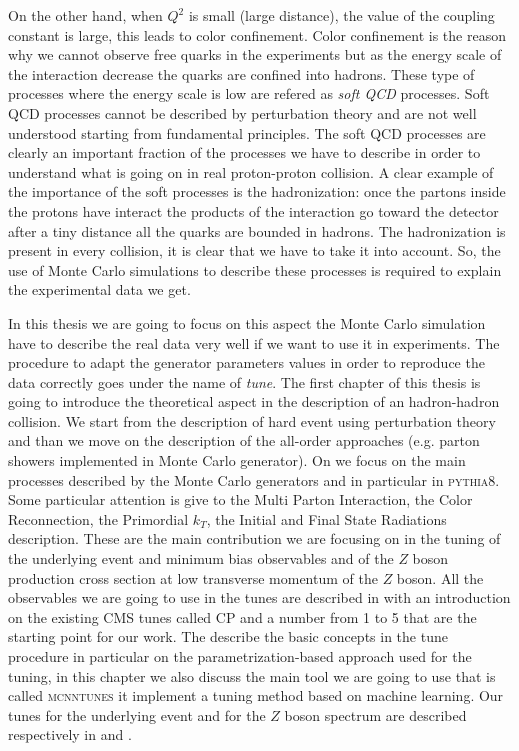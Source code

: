 \noindent On the other hand, when $Q^2$ is small (large distance), the value of the coupling constant is large, this leads to color confinement. Color confinement is the reason why we cannot observe free quarks in the experiments but as the energy scale of the interaction decrease the quarks are confined into hadrons. These type of processes where the energy scale is low are refered as \textit{soft QCD} processes. Soft QCD processes cannot be described by perturbation theory and are not well understood starting from fundamental principles. The soft QCD processes are clearly an important fraction of the processes we have to describe in order to understand what is going on in real proton-proton collision. A clear example of the importance of the soft processes is the hadronization: once the partons inside the protons have interact the products of the interaction go toward the detector after a tiny distance all the quarks are bounded in hadrons. The hadronization is present in every collision, it is clear that we have to take it into account.  
So, the use of Monte Carlo simulations to describe these processes is required to explain the experimental data we get. 


In this thesis we are going to focus on this aspect the Monte Carlo simulation have to describe the real data very well if we want to use it in experiments. The procedure to adapt the generator parameters values in order to reproduce the data correctly goes under the name of \textit{tune}. The first chapter of this thesis is going to introduce the theoretical aspect in the description of an hadron-hadron collision. We start from the description of hard event using perturbation theory and than we move on the description of the all-order approaches (e.g. parton showers implemented in Monte Carlo generator). On   we focus on the main processes described by the Monte Carlo generators and in particular in \textsc{pythia8}. Some particular attention is give to the Multi Parton Interaction, the Color Reconnection, the Primordial $k_T$, the Initial and Final State Radiations description. These are the main contribution we are focusing on in the tuning of the underlying event and minimum bias observables and of the $Z$ boson production cross section at low transverse momentum of the $Z$ boson. All the observables we are going to use in the tunes are described in  with an introduction on the existing CMS tunes called CP and a number from 1 to 5 that are the starting point for our work. The  describe the basic concepts in the tune procedure in particular on the parametrization-based approach used for the tuning, in this chapter we also discuss the main tool we are going to use that is called \textsc{mcnntunes} it implement a tuning method based on machine learning. Our tunes for the underlying event and for the $Z$ boson spectrum are described respectively in  and .
 